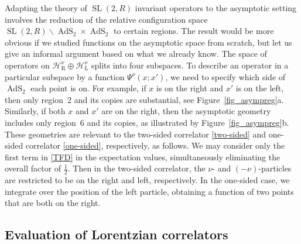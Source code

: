 \documentclass[11pt]{article}
\newcommand{\calH}{\mathcal{H}}
\newcommand{\RR}{\mathbb{R}}
\DeclareMathOperator{\tSL}{\widetilde{\mathrm{SL}}}
\DeclareMathOperator{\tAdS}{\widetilde{AdS}}
\newcommand{\la}{\text{L}}
\newcommand{\ra}{\text{R}}
\def\widetilde#1{#1}%
\def\RR{R}
\begin{document}
Adapting the theory of $\tSL(2,\RR)$ invariant operators to the asymptotic setting involves the reduction of the relative configuration space $\tSL(2,\RR)\backslash \tAdS_2\times\tAdS_2$ to certain regions. The result would be more obvious if we studied functions on the asymptotic space from scratch, but let us give an informal argument based on what we already know. The space of operators on $\calH^{\nu}_{\ra}\oplus\calH^{\nu}_{\la}$ splits into four subspaces. To describe an operator in a particular subspace by a function $\Psi^{\nu}(x;x')$, we need to specify which side of $\tAdS_2$ each point is on. For example, if $x$ is on the right and $x'$ is on the left, then only region~2 and its copies are substantial, see Figure~\ref{fig_asympreg}a. Similarly, if both $x$ and $x'$ are on the right, then the asymptotic geometry includes only region~6 and its copies, as illustrated by Figure~\ref{fig_asympreg}b. These geometries are relevant to the two-sided correlator \eqref{two-sided} and one-sided correlator \eqref{one-sided}, respectively, as follows. We may consider only the first term in \eqref{TFD} in the expectation values, simultaneously eliminating the overall factor of $\frac{1}{2}$. Then in the two-sided correlator, the $\nu$- and $(-\nu)$-particles are restricted to be on the right and left, respectively. In the one-sided case, we integrate over the position of the left particle, obtaining a function of two points that are both on the right. 



\subsection{Evaluation of Lorentzian correlators}
\end{document}
